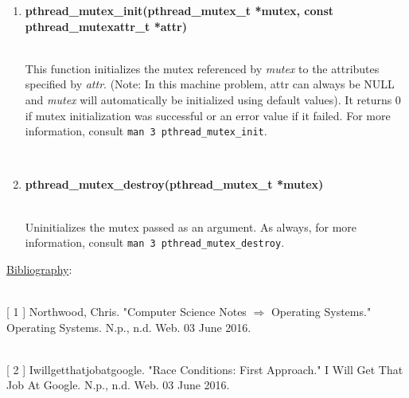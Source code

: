 \documentclass[12pt]{extarticle}
\newenvironment{myindentpar}[1]%
 {\begin{list}{}%
         {\setlength{\leftmargin}{#1}}%
         \item[]%
 }
 {\end{list}}
\newcommand{\code}[1]{\colorbox{codegray}{\texttt{#1}}}
\begin{document}
\begin{myindentpar}{5mm}
\begin{enumerate}
        \vspace{-7mm}
        \ \\
        \item \textbf{pthread\_mutex\_init(pthread\_mutex\_t *mutex, const pthread\_mutexattr\_t *attr)}
        
        \ \\
        This function initializes the mutex referenced by \emph{mutex} to the attributes specified by \emph{attr}.  (Note: In this machine problem, attr can always be NULL and \emph{mutex} will automatically be initialized using default values).  It returns 0 if mutex initialization was successful or an error value if it failed.  For more information, consult \code{man 3 pthread\_mutex\_init}.  

        \vspace{-7mm}
        \ \\        
        \item \textbf{pthread\_mutex\_destroy(pthread\_mutex\_t *mutex)}
        
        \ \\
        Uninitializes the mutex passed as an argument.  As always, for more information, consult \code{man 3 pthread\_mutex\_destroy}.  
        
    \end{enumerate}

\end{myindentpar}

\newpage
\noindent
{\large \underline{Bibliography}:}

\ \\
{[} 1 {]} \hspace{1.2mm} Northwood, Chris. "Computer Science Notes $\Rightarrow$ Operating Systems." Operating
\hspace*{1.15cm} Systems. N.p., n.d. Web. 03 June 2016.

\ \\
{[} 2 {]} \hspace{1.7mm} Iwillgetthatjobatgoogle. "Race Conditions: First Approach." I Will Get That Job
\hspace*{1.05cm} At Google. N.p., n.d. Web. 03 June 2016.
\end{document}
